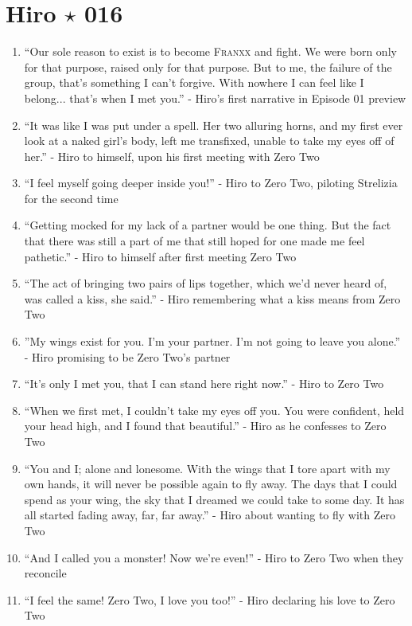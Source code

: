 \documentclass{book}
\numberwithin{equation}{section}
\begin{document}
\section{Hiro $\star$ 016}
\begin{enumerate}
    \item ``Our sole reason to exist is to become \textsc{Franxx} and fight. We were born only for that purpose, raised only for that purpose. But to me, the failure of the group, that's something I can't forgive. With nowhere I can feel like I belong... that's when I met you.'' - Hiro's first narrative in Episode 01 preview
    \item ``It was like I was put under a spell. Her two alluring horns, and my first ever look at a naked girl's body, left me transfixed, unable to take my eyes off of her.'' - Hiro to himself, upon his first meeting with Zero Two
    \item ``I feel myself going deeper inside you!'' - Hiro to Zero Two, piloting Strelizia for the second time 
    \item ``Getting mocked for my lack of a partner would be one thing. But the fact that there was still a part of me that still hoped for one made me feel pathetic.'' - Hiro to himself after first meeting Zero Two
    \item ``The act of bringing two pairs of lips together, which we'd never heard of, was called a kiss, she said.'' - Hiro remembering what a kiss means from Zero Two
    \item  ''My wings exist for you. I'm your partner. I'm not going to leave you alone.'' - Hiro promising to be Zero Two's partner
    \item ``It's only I met you, that I can stand here right now.'' - Hiro to Zero Two
    \item ``When we first met, I couldn't take my eyes off you. You were confident, held your head high, and I found that beautiful.'' - Hiro as he confesses to Zero Two
    \item ``You and I; alone and lonesome. With the wings that I tore apart with my own hands, it will never be possible again to fly away. The days that I could spend as your wing, the sky that I dreamed we could take to some day. It has all started fading away, far, far away.'' - Hiro about wanting to fly with Zero Two
    \item ``And I called you a monster! Now we're even!'' - Hiro to Zero Two when they reconcile
    \item ``I feel the same! Zero Two, I love you too!'' - Hiro declaring his love to Zero Two

\end{enumerate}
\end{document}
